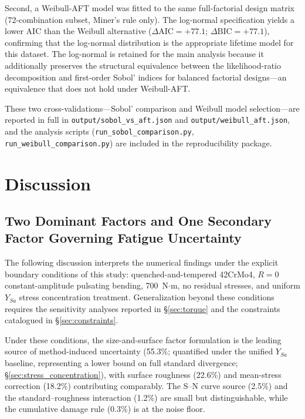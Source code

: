 \documentclass[twocolumn,12pt,a4paper]{article}
\begin{document}
Second, a Weibull-AFT model was fitted to the same full-factorial
design matrix (72-combination subset, Miner's rule only). The
log-normal specification yields a lower AIC than the Weibull
alternative ($\Delta\mathrm{AIC} = +77.1$; $\Delta\mathrm{BIC} =
+77.1$), confirming that the log-normal distribution is the
appropriate lifetime model for this dataset. The log-normal is
retained for the main analysis because it additionally preserves the
structural equivalence between the likelihood-ratio decomposition and
first-order Sobol' indices for balanced factorial designs---an
equivalence that does not hold under Weibull-AFT.

These two cross-validations---Sobol' comparison and Weibull model
selection---are reported in full in \texttt{output/sobol\_vs\_aft.json}
and \texttt{output/weibull\_aft.json}, and the analysis scripts
(\texttt{run\_sobol\_comparison.py}, \texttt{run\_weibull\_comparison.py})
are included in the reproducibility package.

\section{Discussion}
\label{sec:discussion}

\subsection{Two Dominant Factors and One Secondary Factor Governing Fatigue Uncertainty}

The following discussion interprets the numerical findings under the
explicit boundary conditions of this study: quenched-and-tempered
42CrMo4, $R=0$ constant-amplitude pulsating bending, 700~N$\cdot$m,
no residual stresses, and uniform $Y_{Sa}$ stress concentration
treatment. Generalization beyond these conditions requires the
sensitivity analyses reported in \S\ref{sec:torque} and the
constraints catalogued in \S\ref{sec:constraints}.

Under these conditions, the size-and-surface factor formulation is
the leading source of method-induced uncertainty (55.3\%; quantified
under the unified $Y_{Sa}$ baseline, representing a lower bound on
full standard divergence; \S\ref{sec:stress_concentration}), with
surface roughness (22.6\%) and mean-stress correction (18.2\%)
contributing comparably. The S--N curve source (2.5\%) and the
standard--roughness interaction (1.2\%) are small but distinguishable,
while the cumulative damage rule (0.3\%) is at the noise floor.
\end{document}
